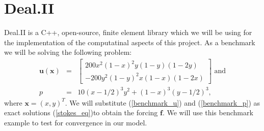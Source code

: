 \documentclass[12pt,a4paper]{article}
\theoremstyle{definition}
\begin{document}
\section{Deal.II}\label{sec_numerics}
Deal.II is a C++, open-source, finite element library which we will be using for the implementation of the computatinal aspects of this project.  As a benchmark we will be solving the following problem:
\begin{eqnarray}
\label{benchmark_u}
	\textbf{u}\left(\textbf{x}\right)&=&\begin{bmatrix}
	200x^2\left(1-x\right)^2y\left(1-y\right)\left(1-2y\right)  \\
	-200y^2\left(1-y\right)^2x\left(1-x\right)\left(1-2x\right)  
	\end{bmatrix} \text{ and}\\\label{benchmark_p}
	p &=& 10\left(x-1/2\right)^3y^2+\left(1-x\right)^3\left(y-1/2\right)^3,
\end{eqnarray}
where $\textbf{x}=\left(x,y\right)^T$.    We will substitute (\ref{benchmark_u}) and (\ref{benchmark_p}) as exact solutions (\ref{stokes_eq})to obtain the forcing $\textbf{f}$.  We will use this benchmark example to test for convergence in our model.
\end{document}
